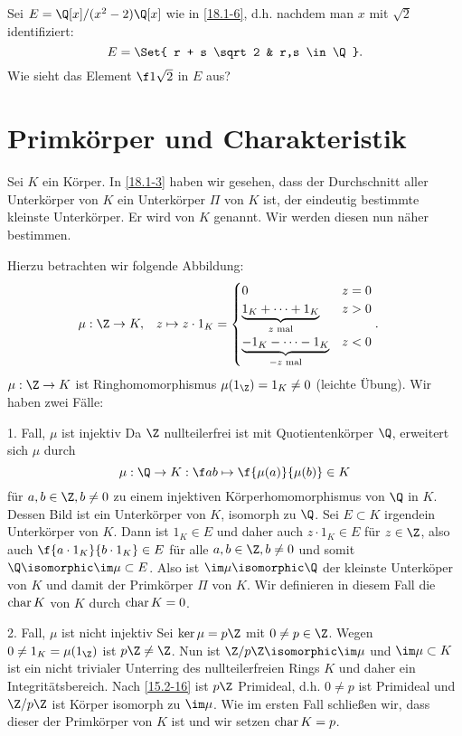 \begin{ex*}
	Sei $E = \Q[x] / (x^2 - 2)\Q[x]$ wie in \ref{18.1-6}, d.h. nachdem man $x$ mit $\sqrt 2$ identifiziert:
	\[
		E = \Set{ r + s \sqrt 2 & r,s \in \Q }.
	\]
	Wie sieht das Element $\f 1{\sqrt 2}$ in $E$ aus?
\end{ex*}


\section{Primkörper und Charakteristik} \label{sec:18.2}


Sei $K$ ein Körper.
In \ref{18.1-3} haben wir gesehen, dass der Durchschnitt aller Unterkörper von $K$ ein Unterkörper $\Pi$ von $K$ ist, der eindeutig bestimmte kleinste Unterkörper.
Er wird  von $K$ genannt.
Wir werden diesen nun näher bestimmen.

Hierzu betrachten wir folgende Abbildung:
\begin{align*}
	\mu: \Z &\to K, &
	z &\mapsto z \cdot 1_K = \begin{cases}
		0 & z = 0 \\
		\underbrace{1_K + \dotsb + 1_K}_{\text{$z$ mal}} & z > 0 \\
		\underbrace{-1_K - \dotsb - 1_K}_{\text{$-z$ mal}} & z < 0
	\end{cases}.
\end{align*}
$\mu: \Z \to K$ ist Ringhomomorphismus $\mu(1_\Z) = 1_K \neq 0$ (leichte Übung).
Wir haben zwei Fälle:
\begin{seg}{1. Fall, $\mu$ ist injektiv}
	Da $\Z$ nullteilerfrei ist mit Quotientenkörper $\Q$, erweitert sich $\mu$ durch
	\[
		\mu: \Q \to K:
		\f ab \mapsto \f{\mu(a)}{\mu(b)} \in K
	\]
	für $a,b \in \Z, b \neq 0$ zu einem injektiven Körperhomomorphismus von $\Q$ in $K$.
	Dessen Bild ist ein Unterkörper von $K$, isomorph zu $\Q$.
	Sei $E \subset K$ irgendein Unterkörper von $K$.
	Dann ist $1_K \in E$ und daher auch $z \cdot 1_K \in E$ für $z \in \Z$, also auch $\f {a \cdot 1_K}{b \cdot 1_K} \in E$ für alle $a, b \in \Z, b \neq 0$ und somit $\Q \isomorphic \im \mu \subset E$.
	Also ist $\im \mu \isomorphic \Q$ der kleinste Unterköper von $K$ und damit der Primkörper $\Pi$ von $K$.
	Wir definieren in diesem Fall die  $\operatorname{char} K$ von $K$ durch $\operatorname{char} K = 0$.
\end{seg}
\begin{seg}{2. Fall, $\mu$ ist nicht injektiv}
	Sei $\ker \mu = p\Z$ mit $0 \neq p \in \Z$.
	Wegen $0 \neq 1_K = \mu(1_\Z)$ ist $p\Z \neq \Z$.
	Nun ist $\Z / p\Z \isomorphic \im \mu$ und $\im \mu \subset K$ ist ein nicht trivialer Unterring des nullteilerfreien Rings $K$ und daher ein Integritätsbereich.
	Nach \ref{15.2-16} ist $p\Z$ Primideal, d.h. $0 \neq p$ ist Primideal und $\Z / p \Z$ ist Körper isomorph zu $\im \mu$.
	Wie im ersten Fall schließen wir, dass dieser der Primkörper von $K$ ist und wir setzen $\operatorname{char} K = p$.
\end{seg}


